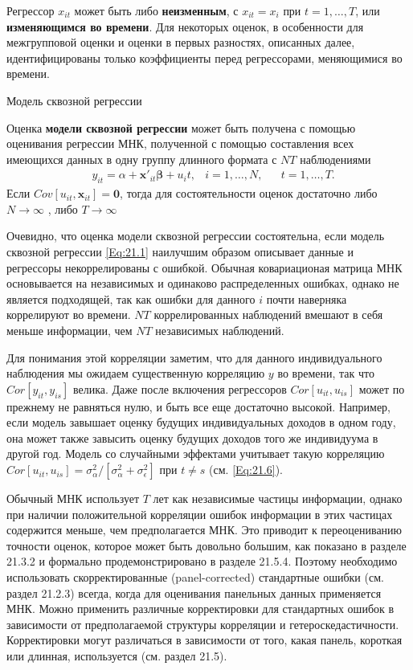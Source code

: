 Регрессор $x_{it}$ может быть либо \textbf{неизменным}, с $x_{it}=x_i$ при $t=1, \dots , T$, или \textbf{изменяющимся во времени}. Для некоторых оценок, в особенности для межгрупповой оценки и оценки в первых разностях, описанных далее, идентифицированы только коэффициенты перед регрессорами, меняющимися во времени.

{\centering
 Модель сквозной регрессии \\}

Оценка \textbf{модели сквозной регрессии} может быть получена с помощью оценивания регрессии МНК, полученной с помощью составления всех имеющихся данных в одну группу длинного формата с $NT$ наблюдениями
\begin{align}
& y_{it} = \alpha +  \mathbf x'_{it} \bm{\beta} + u_it, 
& i= 1, \dots, N, &
& t=1, \dots, T.
\nonumber
\end{align}
Если $Cov[u_{it}, \mathbf x_{it} ] = \mathbf 0$, тогда для состоятельности оценок достаточно либо $ N \rightarrow  \infty$ , либо $T\rightarrow \infty$

Очевидно, что оценка модели сквозной регрессии состоятельна, если модель сквозной регрессии \ref{Eq:21.1} наилучшим образом описывает данные и регрессоры некоррелированы с ошибкой. Обычная ковариационая матрица МНК основывается на независимых и одинаково распределенных ошибках, однако не является подходящей, так как ошибки для данного $i$ почти наверняка коррелируют  во времени. $NT$ коррелированных наблюдений вмешают в себя меньше информации, чем $NT$ независимых наблюдений.

Для понимания этой корреляции заметим, что для данного индивидуального наблюдения мы ожидаем существенную корреляцию $y$  во времени, так что $Cor[y_{it}, y_{is}]$ велика. Даже после включения регрессоров $Cor[u_{it}, u_{is}]$ может по прежнему не равняться нулю, и быть все еще достаточно высокой. Например, если модель завышает оценку будущих индивидуальных доходов в одном году, она может также завысить оценку будущих доходов того же индивидуума в другой год. Модель со случайными эффектами учитывает такую корреляцию $Cor[u_{it}, u_{is}] = \sigma^2_\alpha / [ \sigma^2_\alpha + \sigma^2_\epsilon]$ при $t \neq s$ (см. \ref{Eq:21.6}).

Обычный МНК использует $T$ лет как независимые частицы информации, однако при наличии положительной корреляции ошибок информации в этих частицах содержится меньше, чем предполагается МНК. Это приводит к переоцениванию точности оценок, которое может быть довольно большим, как показано в разделе 21.3.2 и формально продемонстрировано в разделе 21.5.4. Поэтому необходимо использовать скорректированные (panel-corrected) стандартные ошибки (см. раздел 21.2.3)  всегда, когда для оценивания панельных данных применяется МНК. Можно применить различные корректировки для стандартных ошибок в зависимости от предполагаемой структуры корреляции и гетероскедастичности. Корректировки могут различаться в зависимости от того, какая панель, короткая или длинная, используется (см. раздел 21.5).

